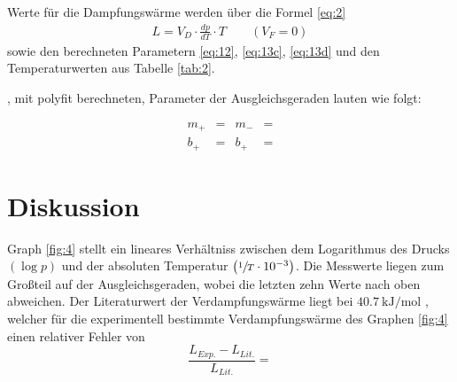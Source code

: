 \justifying Werte für die Dampfungswärme werden über die Formel \eqref{eq:2}  
\begin{align}
    L= V_D \cdot \frac{dp}{dT}\cdot T \qquad (V_F = 0) \label{eq:14}
\end{align}
sowie den berechneten Parametern \eqref{eq:12}, \eqref{eq:13c}, \eqref{eq:13d} und den Temperaturwerten aus Tabelle \ref{tab:2}.

\justifying, mit polyfit \cite{numpy} berechneten,  Parameter der Ausgleichsgeraden lauten wie folgt:

\begin{subequations} \label{eq:15}
\begin{align}
    m_{+} &= \text{}  &m_{-} &=\text{}  \label{eq:15a}\\
    b_{+} &= \text{} &b_{+} &= \text{}  \label{eq:15b}
\end{align}
\end{subequations}
\newpage


\section{Diskussion}

\justifying Graph \ref{fig:4} stellt ein lineares Verhältniss zwischen dem Logarithmus des Drucks $\left( \log{p} \right)$ und 
der absoluten Temperatur $\left( \sfrac{1}{T} \cdot 10^{-3} \right)$. Die Messwerte liegen zum Großteil auf der Ausgleichsgeraden, wobei die letzten 
zehn Werte nach oben abweichen. Der Literaturwert der Verdampfungswärme liegt bei $\SI{40.7}{\kilo\joule\per\mole}$ \cite{Verdampfungswärme}, welcher
für die experimentell bestimmte Verdampfungswärme des Graphen \ref{fig:4} einen relativer Fehler von
\begin{equation}
    \frac{L_{Exp.} - L_{Lit.}}{L_{Lit.}} = \text{} \label{eq:16}
\end{equation}


\newpage
\printbibliography



